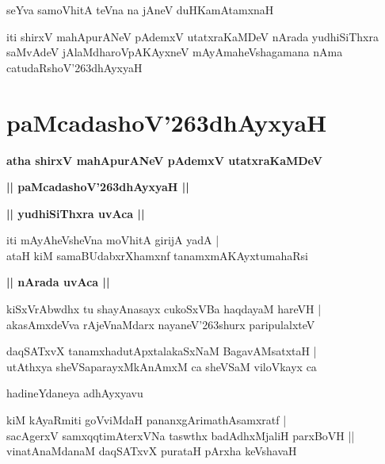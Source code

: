 \documentclass[twoside,12pt,openright]{book}
\def\S{\char'263}
\newcounter{shloka}[chapter]
\def\uvaca#1{\centerline{{\large\textbf{#1}}}}
\begin{document}
\begin{shloka}%
seYva samoVhitA teVna na jAneV duHKamAtamxnaH 
\end{shloka}

\begin{center}
iti shirxV mahApurANeV pAdemxV utatxraKaMDeV  nArada yudhiSiThxra saMvAdeV jAlaMdharoVpAKAyxneV 
mAyAmaheVshagamana nAma catudaRshoV\S dhAyxyaH 
\end{center}

\chapter{paMcadashoV\S dhAyxyaH}

\begin{center}
{\LARGE\bfseries atha shirxV mahApurANeV pAdemxV utatxraKaMDeV} 
\end{center}

\begin{center}
{\LARGE\bfseries  || paMcadashoV\S dhAyxyaH ||}
\end{center}

\uvaca{|| yudhiSiThxra uvAca ||}

\begin{shloka}%
iti mAyAheVsheVna moVhitA girijA yadA |\\
ataH kiM samaBUdabxrXhamxnf tanamxmAKAyxtumahaRsi
\end{shloka}

\uvaca{|| nArada uvAca ||}

\begin{shloka}%
kiSxVrAbwdhx tu shayAnasayx cukoSxVBa haqdayaM hareVH |\\
akasAmxdeVva rAjeVnaMdarx nayaneV\S shurx paripulalxteV 
\end{shloka}

\begin{shloka}%
daqSATxvX tanamxhadutApxtalakaSxNaM BagavAMsatxtaH |\\
utAthxya sheVSaparayxMkAnAmxM ca sheVSaM viloVkayx ca 
\end{shloka}

\begin{center}
hadineYdaneya adhAyxyavu
\end{center}

\begin{shloka}%
kiM kAyaRmiti goVviMdaH pananxgArimathAsamxratf |\\
sacAgerxV samxqqtimAterxVNa taswthx badAdhxMjaliH parxBoVH ||\\
vinatAnaMdanaM daqSATxvX purataH pArxha keVshavaH 
\end{shloka}
\end{document}

